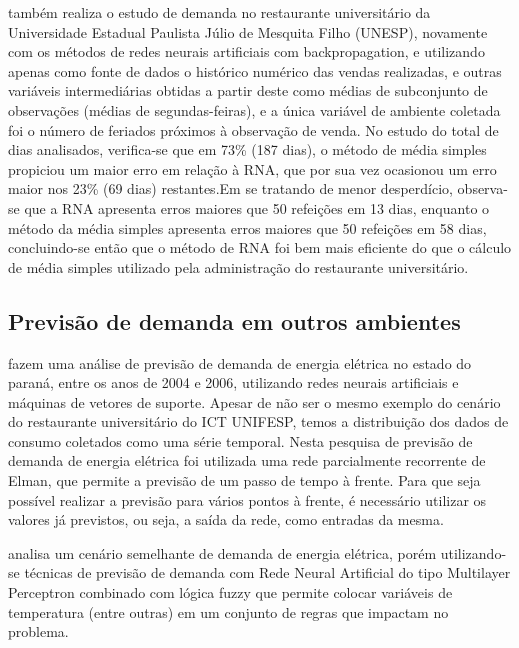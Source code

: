 \documentclass[	12pt, Times, openright, twoside, a4paper, english, brazil]{abntex2}
\begin{document}
         \cite{Rocha2011} também realiza o estudo de demanda no restaurante universitário da Universidade Estadual Paulista Júlio de Mesquita Filho (UNESP), novamente com os métodos de redes neurais artificiais com backpropagation, e utilizando apenas como fonte de dados o histórico numérico das vendas realizadas, e outras variáveis intermediárias obtidas a partir deste como médias de subconjunto de observações (médias de segundas-feiras), e a única variável de ambiente coletada foi o número de feriados próximos à observação de venda. No estudo do total de dias analisados, verifica-se que em 73\% (187 dias), o método de média simples propiciou um maior erro em relação à RNA, que por sua vez ocasionou um erro maior nos 23\% (69 dias) restantes.Em se tratando de menor desperdício, observa-se que a RNA apresenta erros maiores que 50 refeições em 13 dias, enquanto o método da média simples apresenta erros maiores que 50 refeições em 58 dias, concluindo-se então que o método de RNA foi bem mais eficiente do que o cálculo de média simples utilizado pela administração do restaurante universitário.
      
      \subsection{Previsão de demanda em outros ambientes} 
         \cite{RUAS2012} fazem uma análise de previsão de demanda de energia elétrica no estado do paraná, entre os anos de 2004 e 2006, utilizando redes neurais artificiais e máquinas de vetores de suporte. Apesar de não ser o mesmo exemplo do cenário do restaurante universitário do ICT UNIFESP, temos a distribuição dos dados de consumo coletados como uma série temporal. Nesta pesquisa de previsão de demanda de energia elétrica foi utilizada uma rede parcialmente recorrente de Elman, que permite a previsão de um passo de tempo à frente. Para que seja possível realizar a previsão para vários pontos à frente, é necessário utilizar os valores já previstos, ou seja, a saída da rede, como entradas da mesma.
        
         \cite{Almeida2013} analisa um cenário semelhante de demanda de energia elétrica, porém utilizando-se técnicas de previsão de demanda com Rede Neural Artificial do tipo Multilayer Perceptron combinado com lógica fuzzy que permite colocar variáveis de temperatura (entre outras) em um conjunto de regras que impactam no problema.
        
\end{document}
